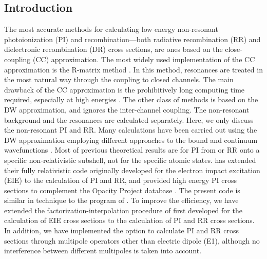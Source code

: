 \subsection{Introduction}
The most accurate methods for calculating low energy non-resonant
photoionization (PI) and recombination---both radiative recombination (RR) and
dielectronic recombination (DR) cross sections, are ones based on the
close-coupling (CC) approximation. The most widely used implementation of the CC
approximation is the R-matrix method \cite{hummer:1993a, berrington:1995a}. In
this method, resonances are treated in the most natural way through the coupling
to closed channels. The main drawback of the CC approximation is the
prohibitively long computing time required, especially at high energies
\cite{zhang:1998a}. The other class of methods is based on the DW approximation,
and ignores the inter-channel coupling. The non-resonant background and the
resonances are calculated separately. Here, we only discuss the non-resonant PI
and RR. Many calculations have been carried out using the DW approximation
employing different approaches to the bound and continuum wavefunctions
\cite{reilman:1979a, clark:1986a, verner:1993a}. Most of previous theoretical
results are for PI from or RR onto a specific non-relativistic subshell, not for
the specific atomic states. \citet{zhang:1998a} has extended their fully
relativistic code originally developed for the electron impact excitation (EIE)
to the calculation of PI and RR, and provided high energy PI cross sections to
complement the Opacity Project database \cite{seaton:1987a}. The present code is
similar in technique to the program of \citet{zhang:1998a}. To improve the
efficiency, we have extended the factorization-interpolation procedure of
\citet{barshalom:1988a} first developed for the calculation of EIE cross
sections to the calculation of PI and RR cross sections. In addition, we have
implemented the option to calculate PI and RR cross sections through multipole
operators other than electric dipole (E1), although no interference between
different multipoles is taken into account. 

